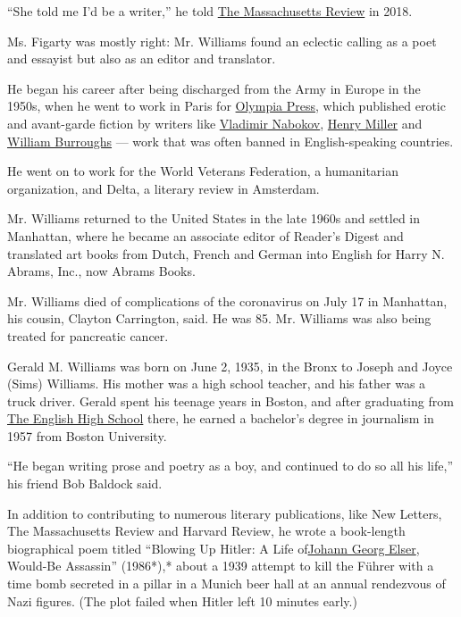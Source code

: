 ``She told me I'd be a writer,'' he told
\href{https://www.massreview.org/node/6609}{The Massachusetts Review} in
2018.

Ms. Figarty was mostly right: Mr. Williams found an eclectic calling as
a poet and essayist but also as an editor and translator.

He began his career after being discharged from the Army in Europe in
the 1950s, when he went to work in Paris for
\href{https://www.nytimes3xbfgragh.onion/1990/07/05/obituaries/maurice-girodias-a-french-publisher-and-an-author-71.html}{Olympia
Press}, which published erotic and avant-garde fiction by writers like
\href{https://www.nytimes3xbfgragh.onion/1977/07/05/archives/vladimir-nabokov-author-of-lolita-and-ada-is-dead-vladimir-nabokov.html}{Vladimir
Nabokov},
\href{https://www.nytimes3xbfgragh.onion/1980/06/09/archives/henry-miller-88-dies-in-california-a-credo-of-hedonism-henry-miller.html}{Henry
Miller} and
\href{https://www.nytimes3xbfgragh.onion/1997/08/03/nyregion/william-s-burroughs-dies-at-83-member-of-the-beat-generation-wrote-naked-lunch.html}{William
Burroughs} --- work that was often banned in English-speaking countries.

He went on to work for the World Veterans Federation, a humanitarian
organization, and Delta, a literary review in Amsterdam.

Mr. Williams returned to the United States in the late 1960s and settled
in Manhattan, where he became an associate editor of Reader's Digest and
translated art books from Dutch, French and German into English for
Harry N. Abrams, Inc., now Abrams Books.

Mr. Williams died of complications of the coronavirus on July 17 in
Manhattan, his cousin, Clayton Carrington, said. He was 85. Mr. Williams
was also being treated for pancreatic cancer.

Gerald M. Williams was born on June 2, 1935, in the Bronx to Joseph and
Joyce (Sims) Williams. His mother was a high school teacher, and his
father was a truck driver. Gerald spent his teenage years in Boston, and
after graduating from \href{https://www.englishhs.org/}{The English High
School} there, he earned a bachelor's degree in journalism in 1957 from
Boston University.

``He began writing prose and poetry as a boy, and continued to do so all
his life,'' his friend Bob Baldock said.

In addition to contributing to numerous literary publications, like New
Letters, The Massachusetts Review and Harvard Review, he wrote a
book-length biographical poem titled ``Blowing Up Hitler: A Life
of\href{https://www.nytimes3xbfgragh.onion/2010/10/16/world/europe/16hitler.html}{Johann
Georg Elser}, Would-Be Assassin'' (1986*),* about a 1939 attempt to kill
the Führer with a time bomb secreted in a pillar in a Munich beer hall
at an annual rendezvous of Nazi figures. (The plot failed when Hitler
left 10 minutes early.)

